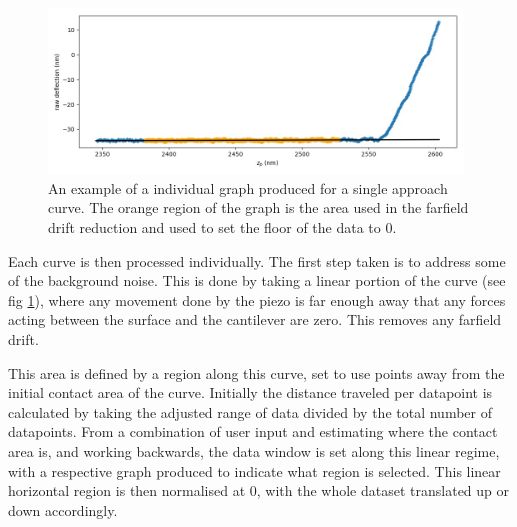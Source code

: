 \begin{figure}[h!]     %
        \begin{center}
          \includegraphics[width=110mm]{chapter4/farfielddrift.jpg}
\end{center}
\caption{An example of a individual graph produced for a single approach curve. The orange region of the graph is the area used in the farfield drift reduction and used to set the floor of the data to 0.}
\label{fig:farfielddrift}                 %
\end{figure}

Each curve is then processed individually. The first step taken is to address some of the background noise. This is done by taking a linear portion of the curve (see fig \ref{fig:farfielddrift}), where any movement done by the piezo is far enough away that any forces acting between the surface and the cantilever are zero. This removes any farfield drift.  %

This area is defined by a region along this curve, set to use points away from the initial contact area of the curve. Initially the distance traveled per datapoint is calculated by taking the adjusted range of data divided by the total number of datapoints. From a combination of user input and estimating where the contact area is, and working backwards, the data window is set along this linear regime, with a respective graph produced to indicate what region is selected. This linear horizontal region is then normalised at 0, with the whole dataset translated up or down accordingly.


